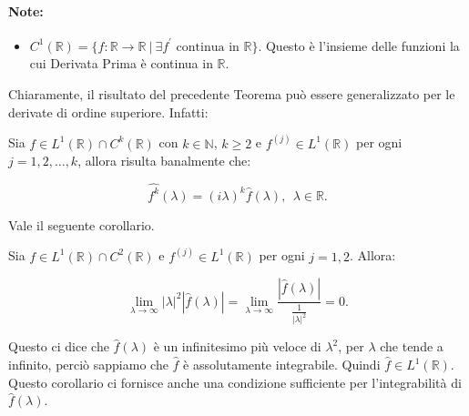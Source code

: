\paragraph{Note:}
\begin{itemize}
    \item $C^1(\mathbb{R}) = \{ f: \mathbb{R} \rightarrow \mathbb{R} \ | \
              \exists f^{\prime} \text{ continua in } \mathbb{R} \}$. Questo è
          l'insieme delle funzioni la cui Derivata Prima è continua in
          $\mathbb{R}$.
\end{itemize}

Chiaramente, il risultato del precedente Teorema può essere generalizzato per le
derivate di ordine superiore. Infatti:

\begin{theorem}
    Sia $f \in L^1(\mathbb{R}) \cap C^k(\mathbb{R})$ con $k \in \mathbb{N}$, $k
        \geq 2$ e $f^{\left(j\right)} \in L^1(\mathbb{R})$ per ogni $j = 1, 2,
        \ldots, k$, allora risulta banalmente che:

    $$
        \widehat{f^k}(\lambda) = (i \lambda)^k \hat{f}(\lambda), \ \ \lambda \in \mathbb{R}.
    $$
\end{theorem}

Vale il seguente corollario.

\begin{corollary}
    Sia $f \in L^1(\mathbb{R}) \cap C^2(\mathbb{R})$ e $f^{\left(j\right)} \in
        L^1(\mathbb{R})$ per ogni $j = 1, 2$. Allora:

    $$
        \lim_{\lambda \rightarrow \infty} \left| \lambda \right|^2 \left| \hat{f}(\lambda) \right|  = \lim_{\lambda \rightarrow \infty} \frac{\left|\hat{f}(\lambda)\right|}{ \frac{1}{ \left| \lambda \right|^2}} = 0.
    $$
\end{corollary}

Questo ci dice che $\hat{f}(\lambda)$ è un infinitesimo più veloce di
$\lambda^2$, per $\lambda$ che tende a infinito, perciò sappiamo che $\hat{f}$ è
assolutamente integrabile. Quindi $\hat{f} \in L^1(\mathbb{R})$. Questo
corollario ci fornisce anche una condizione sufficiente per l'integrabilità di
$\hat{f}(\lambda)$.
